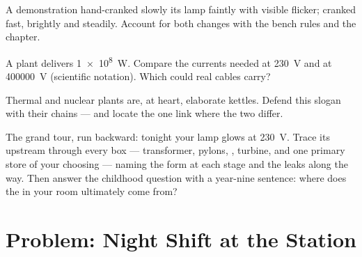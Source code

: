 \begin{exercise}[$\star\star$]\label{exo:g9:alternator:9}
A demonstration  hand-cranked slowly  its
lamp faintly with visible flicker; cranked fast, brightly
and steadily. Account for both changes with the bench rules
and the  chapter.
\end{exercise}

\begin{exercise}[$\star\star$]\label{exo:g9:alternator:10}
A plant delivers \qty{1e8}{W}. Compare the currents needed
at \qty{230}{V} and at \qty{400000}{V} (scientific
notation). Which could real cables carry?
\end{exercise}

\begin{exercise}[$\star\star$]\label{exo:g9:alternator:11}
Thermal and nuclear plants are, at heart, elaborate
kettles. Defend this slogan with their chains --- and
locate the one link where the two differ.
\end{exercise}

\begin{exercise}[$\star\star\star$]\label{exo:g9:alternator:12}
The grand tour, run backward: tonight your lamp glows at
\qty{230}{V}. Trace its  upstream through every box
--- transformer, pylons, , turbine, and one
primary store of your choosing --- naming the 
form at each stage and the leaks along the way. Then
answer the childhood question with a year-nine sentence:
where does the  in your room ultimately come from?
\end{exercise}

\section{Problem: Night Shift at the Station}

